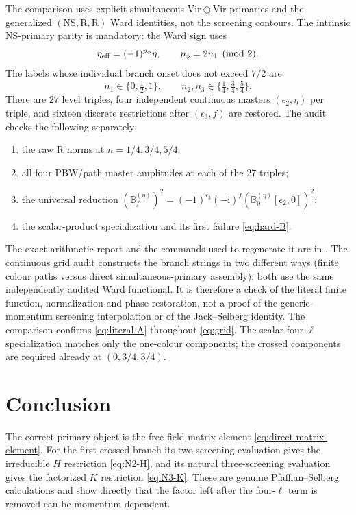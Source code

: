 \documentclass[11pt]{article}
\newcommand{\NS}{\mathrm{NS}}
\newcommand{\R}{\mathrm{R}}
\newcommand{\Vir}{\mathrm{Vir}}
\newcommand{\eps}{\epsilon}
\newcommand{\ii}{\mathrm i}
\begin{document}
The comparison uses explicit simultaneous $\Vir\oplus\Vir$ primaries and
the generalized $(\NS,\R,\R)$ Ward identities, not the screening contours.
The intrinsic NS-primary parity is mandatory: the Ward sign uses
\begin{equation}
 \eta_{\rm eff}=(-1)^{p_\phi}\eta,
 \qquad p_\phi=2n_1\pmod2.
 \label{eq:eta-effective}
\end{equation}
The labels whose individual branch onset does not exceed $7/2$ are
\begin{equation}
 n_1\in\{0,\tfrac12,1\},\qquad
 n_2,n_3\in\{\tfrac14,\tfrac34,\tfrac54\}.
 \label{eq:grid}
\end{equation}
There are $27$ level triples, four independent continuous masters
$(\eps_2,\eta)$ per triple, and sixteen discrete restrictions after
$(\eps_3,f)$ are restored.  The audit checks the following separately:
\begin{enumerate}
 \item the raw R norms at $n=1/4,3/4,5/4$;
 \item all four PBW/path master amplitudes at each of the 27 triples;
 \item the universal reduction
 $(\mathbb B_f^{(\eta)})^2=(-1)^{\eps_3}(-\ii)^f
 (\mathbb B_0^{(\eta)}[\eps_2,0])^2$;
 \item the scalar-product specialization and its first failure
 \eqref{eq:hard-B}.
\end{enumerate}
The exact arithmetic report and the commands used to regenerate it are in
.  The continuous grid audit constructs
the branch strings in two different ways (finite colour paths versus direct
simultaneous-primary assembly); both use the same independently audited Ward
functional.  It is therefore a check of the literal finite function,
normalization and phase restoration, not a proof of the generic-momentum
screening interpolation or of the Jack--Selberg identity.  The comparison
confirms \eqref{eq:literal-A} throughout \eqref{eq:grid}.  The scalar
four-$\ell$ specialization matches only the one-colour components; the
crossed components are required already at $(0,3/4,3/4)$.

\section{Conclusion}

The correct primary object is the free-field matrix element
\eqref{eq:direct-matrix-element}.  For the first crossed branch its
two-screening evaluation gives the irreducible $H$ restriction
\eqref{eq:N2-H}, and its natural three-screening evaluation gives the
factorized $K$ restriction \eqref{eq:N3-K}.  These are genuine
Pfaffian--Selberg calculations and show directly that the factor left after
the four-$\ell$ term is removed can be momentum dependent.
\end{document}
